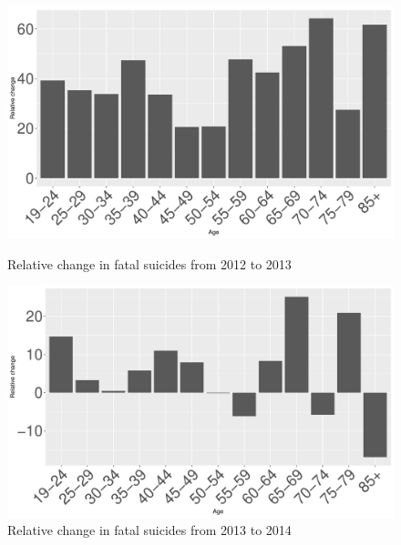 \documentclass{article}
\begin{document}
\begin{figure}[H]
	\centering
	\begin{minipage}{0.45\textwidth}
		\includegraphics[width=\textwidth]{imgs/pl-fat-19_85-12_13.pdf}
		\caption{Relative change in fatal suicides from 2012 to 2013}
		\label{fig:pl-fat-19_85-12_13}
	\end{minipage}
	\hfill
	\begin{minipage}{0.45\textwidth}
		\includegraphics[width=\textwidth]{imgs/pl-fat-19_85-13_14.pdf}
		\caption{Relative change in fatal suicides from 2013 to 2014}
		\label{fig:pl-fat-19_85-13_14}
	\end{minipage}
\end{figure}
\end{document}
